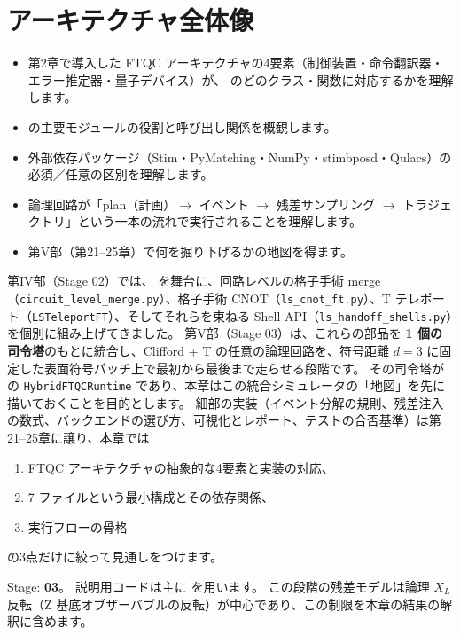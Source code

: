 \chapter{アーキテクチャ全体像}\label{ch:architecture}

\begin{chaptergoal}
  \begin{itemize}
  \item 第2章で導入した FTQC アーキテクチャの4要素（制御装置・命令翻訳器・エラー推定器・量子デバイス）が、 のどのクラス・関数に対応するかを理解します。
  \item {} の主要モジュールの役割と呼び出し関係を概観します。
  \item 外部依存パッケージ（Stim・PyMatching・NumPy・stimbposd・Qulacs）の必須／任意の区別を理解します。
  \item 論理回路が「plan（計画）$\to$ イベント $\to$ 残差サンプリング $\to$ トラジェクトリ」という一本の流れで実行されることを理解します。
  \item 第V部（第21–25章）で何を掘り下げるかの地図を得ます。
  \end{itemize}
\end{chaptergoal}

第IV部（Stage 02）では、 を舞台に、回路レベルの格子手術 merge（\texttt{circuit\_level\_merge.py}）、格子手術 CNOT（\texttt{ls\_cnot\_ft.py}）、T テレポート（\texttt{LSTeleportFT}）、そしてそれらを束ねる Shell API（\texttt{ls\_handoff\_shells.py}）を個別に組み上げてきました。
第V部（Stage 03）は、これらの部品を \textbf{1 個の司令塔}のもとに統合し、Clifford + T の任意の論理回路を、符号距離 $d=3$ に固定した表面符号パッチ上で最初から最後まで走らせる段階です。
その司令塔が  の \lstinline{HybridFTQCRuntime} であり、本章はこの統合シミュレータの「地図」を先に描いておくことを目的とします。
細部の実装（イベント分解の規則、残差注入の数式、バックエンドの選び方、可視化とレポート、テストの合否基準）は第21–25章に譲り、本章では
\begin{enumerate}
  \item FTQC アーキテクチャの抽象的な4要素と実装の対応、
  \item 7 ファイルという最小構成とその依存関係、
  \item 実行フローの骨格
\end{enumerate}
の3点だけに絞って見通しをつけます。

\begin{notebox}
  Stage: \textbf{03}。
  説明用コードは主に  を用います。
  この段階の残差モデルは論理 $X_L$ 反転（Z 基底オブザーバブルの反転）が中心であり、この制限を本章の結果の解釈に含めます。
\end{notebox}

